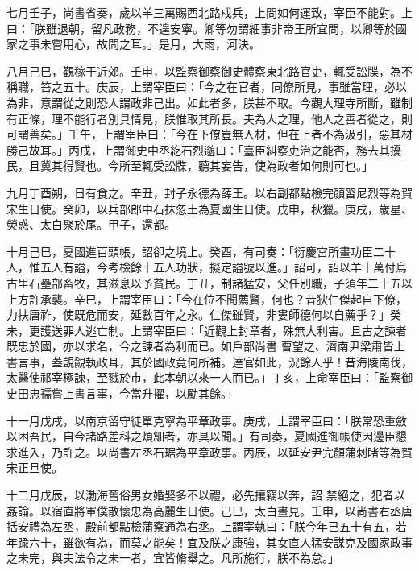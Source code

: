 \begin{pinyinscope}
 七月壬子，尚書省奏，歲以羊三萬賜西北路戍兵，上問如何運致，宰臣不能對。上曰：「朕雖退朝，留凡政務，不遑安寧。卿等勿謂細事非帝王所宜問，以卿等於國家之事未嘗用心，故問之耳。」是月，大雨，河決。



 八月己巳，觀稼于近郊。壬申，以監察御察御史體察東北路官吏，輒受訟牒，為不稱職，笞之五十。庚辰，上謂宰臣曰：「今之在官者，同僚所見，事雖當理，必以
 為非，意謂從之則恐人謂政非己出。如此者多，朕甚不取。今觀大理寺所斷，雖制有正條，理不能行者別具情見，朕惟取其所長。夫為人之理，他人之善者從之，則可謂善矣。」壬午，上謂宰臣曰：「今在下僚豈無人材，但在上者不為汲引，惡其材勝己故耳。」丙戌，上謂御史中丞紇石烈邈曰：「臺臣糾察吏治之能否，務去其擾民，且冀其得賢也。今所至輒受訟牒，聽其妄告，使為政者如何則可也。」



 九月丁酉朔，日有食之。辛丑，封子永德為薛王。以右副都點檢完顏習尼烈等為賀宋生日使。癸卯，以兵部郎中石抹忽土為夏國生日使。戊申，秋獵。庚戌，歲星、
 熒惑、太白聚於尾。甲子，還都。



 十月己巳，夏國進百頭帳，詔卻之境上。癸酉，有司奏：「衍慶宮所畫功臣二十人，惟五人有謚，今考檢餘十五人功狀，擬定謚號以進。」詔可，詔以羊十萬付烏古里石壘部畜牧，其滋息以予貧民。丁丑，制諸猛安，父任別職，子須年二十五以上方許承襲。辛巳，上謂宰臣曰：「今在位不聞薦賢，何也？昔狄仁傑起自下僚，力扶唐祚，使既危而安，延數百年之永。仁傑雖賢，非婁師德何以自薦乎？」癸未，更護送罪人逃亡制。上謂宰臣曰：「近觀上封章者，殊無大利害。且古之諫者既忠於國，亦以求名，今之諫者為利而已。如戶部尚書
 曹望之、濟南尹梁肅皆上書言事，蓋覬覦執政耳，其於國政竟何所補。達官如此，況餘人乎！昔海陵南伐，太醫使祁宰極諫，至戮於市，此本朝以來一人而已。」丁亥，上命宰臣曰：「監察御史田忠孺嘗上書言事，今當升擢，以勵其餘。」



 十一月戊戌，以南京留守徒單克寧為平章政事。庚戌，上謂宰臣曰：「朕常恐重斂以困吾民，自今諸路差科之煩細者，亦具以聞。」有司奏，夏國進御帳使因邊臣懇求進入，乃許之。以尚書左丞石琚為平章政事。丙辰，以延安尹完顏蒲剌睹等為賀宋正旦使。



 十二月戊辰，以渤海舊俗男女婚娶多不以禮，必先攘竊以奔，詔
 禁絕之，犯者以姦論。以宿直將軍僕散懷忠為高麗生日使。己巳，太白晝見。壬申，以尚書右丞唐括安禮為左丞，殿前都點檢蒲察通為右丞。上謂宰執曰：「朕今年已五十有五，若年踰六十，雖欲有為，而莫之能矣！宜及朕之康強，其女直人猛安謀克及國家政事之未完，與夫法令之未一者，宜皆脩舉之。凡所施行，朕不為怠。」




\end{pinyinscope}
